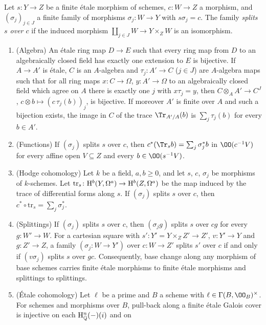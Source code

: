\begin{lemma}\label{pf:steps1:trsplit}
Let $s\colon Y\to Z$ be a finite \'etale morphism of schemes, $c\colon W\to Z$ a morphism, and $(\sigma_j)_{j\in J}$ a finite
family of morphisms $\sigma_j\colon W\to Y$ with $s\sigma_j=c$. The family \emph{splits $s$ over $c$} if the induced morphism
$\coprod_{j\in J}W\to Y\times_ZW$ is an isomorphism.
\begin{enumerate}[label=\textup{(\roman*)},nosep]
\item \textup{(Algebra)} An \'etale ring map $D\to E$ such that every ring map from $D$ to an algebraically closed field has
  exactly one extension to $E$ is bijective. If $A\to A'$ is \'etale, $C$ is an $A$-algebra and $\tau_j\colon A'\to C$
  ($j\in J$) are $A$-algebra maps such that for all ring maps $x\colon C\to\Omega$, $y\colon A'\to\Omega$ to an
  algebraically closed field which agree on $A$ there is exactly one $j$ with $x\tau_j=y$, then $C\otimes_AA'\to C^J$,
  $c\otimes b\mapsto(c\,\tau_j(b))_j$, is bijective. If moreover $A'$ is finite over $A$ and such a bijection exists, the image
  in $C$ of the trace $\Tr_{A'/A}(b)$ is $\sum_j\tau_j(b)$ for every $b\in A'$.
\item \textup{(Functions)} If $(\sigma_j)$ splits $s$ over $c$, then $c^*(\Tr_s b)=\sum_j\sigma_j^*b$ in $\OO(c^{-1}V)$ for every
  affine open $V\subseteq Z$ and every $b\in\OO(s^{-1}V)$.
\item \textup{(Hodge cohomology)} Let $k$ be a field, $a,b\ge0$, and let $s$, $c$, $\sigma_j$ be morphisms of $k$-schemes. Let
  $\mathrm{tr}_s\colon\mathrm{H}^b(Y,\Omega^a)\to\mathrm{H}^b(Z,\Omega^a)$ be the map induced by the trace of differential forms
  along $s$. If $(\sigma_j)$ splits $s$ over $c$, then $c^*\circ\mathrm{tr}_s=\sum_j\sigma_j^*$.
\item \textup{(Splittings)} If $(\sigma_j)$ splits $s$ over $c$, then $(\sigma_jg)$ splits $s$ over $cg$ for every $g\colon W'\to
  W$. For a cartesian square with $s'\colon Y'=Y\times_ZZ'\to Z'$, $v\colon Y'\to Y$ and $g\colon Z'\to Z$, a family
  $(\sigma_j\colon W\to Y')$ over $c\colon W\to Z'$ splits $s'$ over $c$ if and only if $(v\sigma_j)$ splits $s$ over $gc$.
  Consequently, base change along any morphism of base schemes carries finite \'etale morphisms to finite \'etale morphisms
  and splittings to splittings.
\item \textup{(\'Etale cohomology)} Let $\ell$ be a prime and $B$ a scheme with $\ell\in\Gamma(B,\OO_B)^\times$. For schemes and
  morphisms over $B$, pull-back along a finite \'etale Galois cover is injective on each $\mathrm{H}_{\mathbb{Q}}^n(-)(i)$ and on

\end{enumerate}
\end{lemma}

